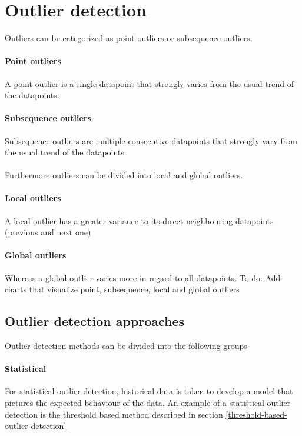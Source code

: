 \chapter{Outlier detection}
Outliers can be categorized as point outliers or subsequence outliers.
\subsubsection{Point outliers}
A point outlier is a single datapoint that strongly varies from the usual trend of the datapoints. \cite{blazquez-garciaReviewOutlierAnomaly2020}

\subsubsection{Subsequence outliers}
Subsequence outliers are multiple consecutive datapoints that strongly vary from the usual trend of the datapoints. \cite{blazquez-garciaReviewOutlierAnomaly2020}\\\\
Furthermore outliers can be divided into local and global outliers. 
\subsubsection{Local outliers}
A local outlier has a greater variance to its direct neighbouring datapoints (previous and next one) \cite{blazquez-garciaReviewOutlierAnomaly2020}

\subsubsection{Global outliers}
Whereas a global outlier varies more in regard to all datapoints.
To do: Add charts that visualize point, subsequence, local and global outliers
\cite{blazquez-garciaReviewOutlierAnomaly2020}

\section{Outlier detection approaches}
Outlier detection methods can be divided into the following groups
\subsubsection{Statistical}
For statistical outlier detection, historical data is taken to develop a model that pictures the expected behaviour of the data. An example of a statistical outlier detection is the threshold based method described in section \ref{threshold-based-outlier-detection} \cite{cookAnomalyDetectionIoT2020, giannoniAnomalyDetectionModels2018}

